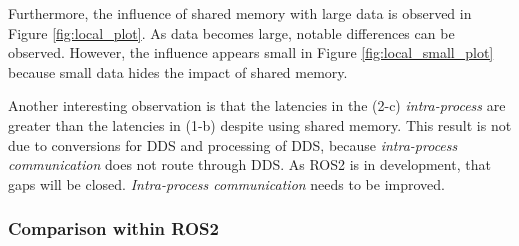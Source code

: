 \documentclass{sig-alternate-05-2015}
\begin{document}
Furthermore, the influence of shared memory with large data is observed in Figure \ref{fig:local_plot}.
As data becomes large, notable differences can be observed.
However, the influence appears small in Figure \ref{fig:local_small_plot} because small data hides the impact of shared memory.

Another interesting observation is that the latencies in the (2-c) \emph{intra-process} are greater than the latencies in (1-b) despite using shared memory.
This result is not due to conversions for DDS and processing of DDS, because \emph{intra-process communication} does not route through DDS.
As ROS2 is in development, that gaps will be closed.
\emph{Intra-process communication} needs to be improved.

\vspace{-2mm}
\subsubsection{Comparison within ROS2}
\label{sec:ros2}
\end{document}
